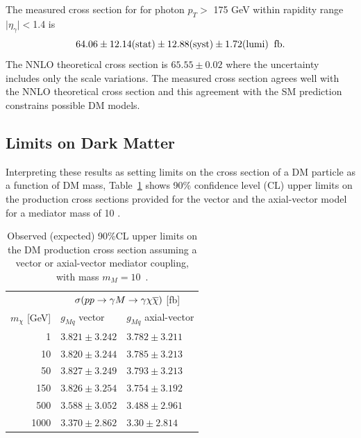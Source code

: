 The measured cross section for \ppzgnng  for photon $p_T >$ 175 GeV within
 rapidity range $\mid \eta_{\gamma}\mid < $1.4
 is 
\begin{equation}
 64.06 \pm 12.14(\mathrm{stat}) \pm 12.88(\mathrm{syst}) \pm 1.72(\mathrm{lumi})\;\; \mathrm{fb}.
\end{equation}
The NNLO theoretical cross section is $65.55\pm 0.02$ \fb
  where the uncertainty includes only the scale variations. 
The measured cross section agrees well with the NNLO theoretical cross section
 and this agreement with the SM prediction constrains
 possible DM models.

 \subsection{Limits on Dark Matter}
\label{ssec:lim_DM}
Interpreting these results as setting limits on the
 cross section of a DM particle as a function of 
 DM mass, Table~\ref{table:lg_xslimits}
 shows 90\% confidence level (CL) upper limits on the
 production cross sections provided for the vector
 and the axial-vector model for a mediator mass of 10 \TeV. 


\begin{table}[ht]
\caption[Upper limits on DM cross sections for $m_M = 10$ \TeV]
{Observed (expected) 90\%CL upper limits
  on the DM production cross section assuming a 
  vector or axial-vector mediator coupling,
  with mass $m_M=10$~\TeV. }
\centering
\begin{tabular}{r|l|l}
     {}        & \multicolumn{2}{c}{$\sigma(pp\rightarrow \gamma M\rightarrow \gamma\chi\overline{\chi})$ [fb]} \\
$m_\chi$ [GeV] & $g_{Mq}$ vector  & $g_{Mq}$ axial-vector    \\
\hline
\hline
1     & $3.821 \pm 3.242$  & $3.782 \pm 3.211$ \\ 
10    & $3.820 \pm 3.244$  & $3.785 \pm 3.213$ \\  
50    & $3.827 \pm 3.249$  & $3.793 \pm 3.213$ \\
150   & $3.826 \pm 3.254$  & $3.754 \pm 3.192$ \\
500   & $3.588 \pm 3.052$  & $3.488 \pm 2.961$ \\
1000  & $3.370 \pm 2.862$  & $3.30  \pm 2.814$ \\
\end{tabular}
\label{table:lg_xslimits}
\end{table}

